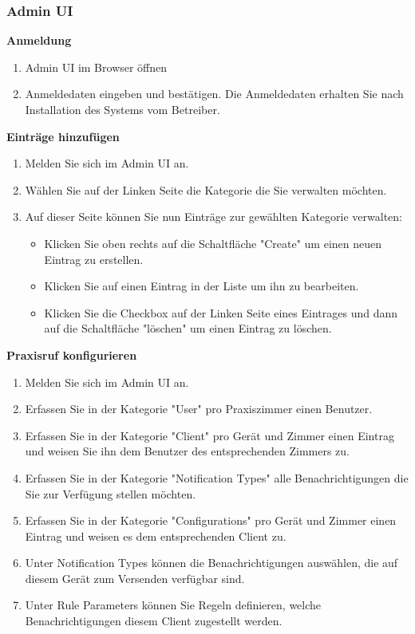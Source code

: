 \subsubsection*{Admin UI}

\textbf{Anmeldung}

\begin{enumerate}
    \item Admin UI im Browser öffnen
    \item Anmeldedaten eingeben und bestätigen. Die Anmeldedaten erhalten Sie nach Installation des Systems vom Betreiber.
\end{enumerate}

\textbf{Einträge hinzufügen}
\begin{enumerate}
    \item Melden Sie sich im Admin UI an.
    \item Wählen Sie auf der Linken Seite die Kategorie die Sie verwalten möchten.
    \item Auf dieser Seite können Sie nun Einträge zur gewählten Kategorie verwalten:
    \begin{itemize}
        \item Klicken Sie oben rechts auf die Schaltfläche "Create" um einen neuen Eintrag zu erstellen.
        \item Klicken Sie auf einen Eintrag in der Liste um ihn zu bearbeiten.
        \item Klicken Sie die Checkbox auf der Linken Seite eines Eintrages und dann auf die Schaltfläche "löschen" um einen Eintrag zu löschen.
    \end{itemize}
\end{enumerate}

\textbf{Praxisruf konfigurieren}
\begin{enumerate}
    \item Melden Sie sich im Admin UI an.
    \item Erfassen Sie in der Kategorie "User" pro Praxiszimmer einen Benutzer.
    \item Erfassen Sie in der Kategorie "Client" pro Gerät und Zimmer einen Eintrag und weisen Sie ihn dem Benutzer des entsprechenden Zimmers zu.
    \item Erfassen Sie in der Kategorie "Notification Types" alle Benachrichtigungen die Sie zur Verfügung stellen möchten.
    \item Erfassen Sie in der Kategorie "Configurations" pro Gerät und Zimmer einen Eintrag und weisen es dem entsprechenden Client zu.
    \item Unter Notification Types können die Benachrichtigungen auswählen, die auf diesem Gerät zum Versenden verfügbar sind.
    \item Unter Rule Parameters können Sie Regeln definieren, welche Benachrichtigungen diesem Client zugestellt werden.
\end{enumerate}

\clearpage
